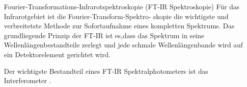 Fourier-Transformations-Infrarotspektroskopie (FT-IR Spektroskopie)
Für das Infrarotgebiet ist die Fourier-Transform-Spektro-
skopie die wichtigste und verbreitetste Methode zur Sofortaufnahme eines kompletten
Spektrums. Das grundliegende Prinzip der FT-IR ist es,dass das Spektrum in seine Wellenlängenbestandteile zerlegt 
und jede schmale Wellenlängenbande wird auf ein Detektorelement gerichtet wird. 

Der wichtigste Bestandteil eines FT-IR Spektralphotometers ist das Interferometer .
